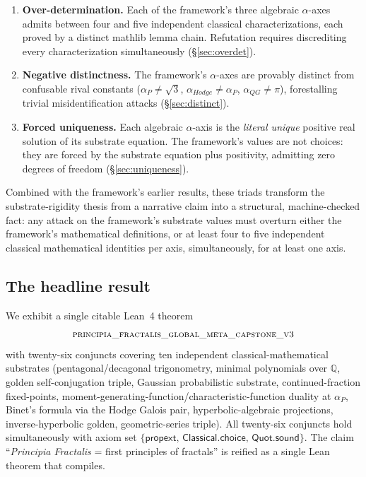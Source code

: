 \documentclass[11pt,a4paper]{amsart}
\theoremstyle{plain}
\theoremstyle{definition}
\newcommand{\Qr}{\mathbb{Q}}
\newcommand{\aP}{\alpha_{P}}
\newcommand{\aHodge}{\alpha_{Hodge}}
\newcommand{\aQG}{\alpha_{QG}}
\newcommand{\kernelaxioms}{\{\mathsf{propext},\,\mathsf{Classical.choice},\,\mathsf{Quot.sound}\}}
\newcommand{\LeanThm}[1]{\textsc{\small #1}}
\begin{document}
\begin{enumerate}[label=(\roman*)]
\item \textbf{Over-determination.} Each of the framework's three
algebraic $\alpha$-axes admits between four and five independent
classical characterizations, each proved by a distinct mathlib lemma
chain. Refutation requires discrediting every characterization
simultaneously (\S\ref{sec:overdet}).

\item \textbf{Negative distinctness.} The framework's $\alpha$-axes are
provably distinct from confusable rival constants ($\aP \neq \sqrt{3}$,
$\aHodge \neq \aP$, $\aQG \neq \pi$), forestalling trivial
misidentification attacks (\S\ref{sec:distinct}).

\item \textbf{Forced uniqueness.} Each algebraic $\alpha$-axis is the
\emph{literal unique} positive real solution of its substrate equation.
The framework's values are not choices: they are forced by the
substrate equation plus positivity, admitting zero degrees of freedom
(\S\ref{sec:uniqueness}).
\end{enumerate}

Combined with the framework's earlier results, these triads transform
the substrate-rigidity thesis from a narrative claim into a structural,
machine-checked fact: any attack on the framework's substrate values
must overturn either the framework's mathematical definitions, or at
least four to five independent classical mathematical identities per
axis, simultaneously, for at least one axis.

\subsection{The headline result}
We exhibit a single citable Lean~4 theorem
\[
\LeanThm{principia\_fractalis\_global\_meta\_capstone\_v3}
\]
with twenty-six conjuncts covering ten independent
classical-mathematical substrates (pentagonal/decagonal trigonometry,
minimal polynomials over $\Qr$, golden self-conjugation triple,
Gaussian probabilistic substrate, continued-fraction fixed-points,
moment-generating-function/characteristic-function duality at $\aP$,
Binet's formula via the Hodge Galois pair, hyperbolic-algebraic
projections, inverse-hyperbolic golden, geometric-series triple). All
twenty-six conjuncts hold simultaneously with axiom set
$\kernelaxioms$. The claim ``\emph{Principia Fractalis} = first
principles of fractals'' is reified as a single Lean theorem that
compiles.
\end{document}
